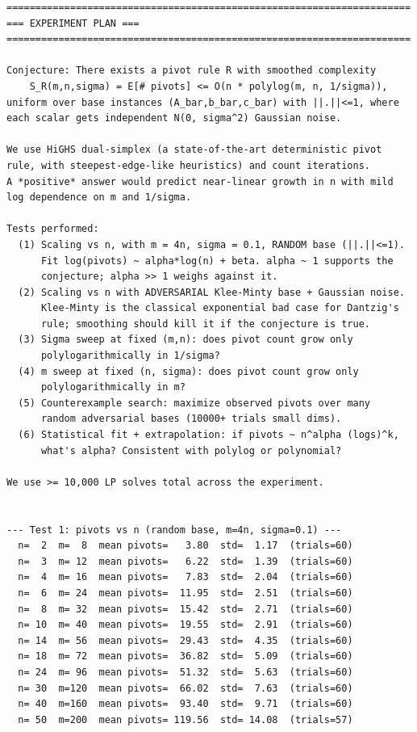 \documentclass[11pt]{article}
\begin{document}
\begin{lstlisting}
======================================================================
=== EXPERIMENT PLAN ===
======================================================================

Conjecture: There exists a pivot rule R with smoothed complexity
    S_R(m,n,sigma) = E[# pivots] <= O(n * polylog(m, n, 1/sigma)),
uniform over base instances (A_bar,b_bar,c_bar) with ||.||<=1, where
each scalar gets independent N(0, sigma^2) Gaussian noise.

We use HiGHS dual-simplex (a state-of-the-art deterministic pivot
rule, with steepest-edge-like heuristics) and count iterations.
A *positive* answer would predict near-linear growth in n with mild
log dependence on m and 1/sigma.

Tests performed:
  (1) Scaling vs n, with m = 4n, sigma = 0.1, RANDOM base (||.||<=1).
      Fit log(pivots) ~ alpha*log(n) + beta. alpha ~ 1 supports the
      conjecture; alpha >> 1 weighs against it.
  (2) Scaling vs n with ADVERSARIAL Klee-Minty base + Gaussian noise.
      Klee-Minty is the classical exponential bad case for Dantzig's
      rule; smoothing should kill it if the conjecture is true.
  (3) Sigma sweep at fixed (m,n): does pivot count grow only
      polylogarithmically in 1/sigma?
  (4) m sweep at fixed (n, sigma): does pivot count grow only
      polylogarithmically in m?
  (5) Counterexample search: maximize observed pivots over many
      random adversarial bases (10000+ trials small dims).
  (6) Statistical fit + extrapolation: if pivots ~ n^alpha (logs)^k,
      what's alpha? Consistent with polylog or polynomial?

We use >= 10,000 LP solves total across the experiment.


--- Test 1: pivots vs n (random base, m=4n, sigma=0.1) ---
  n=  2  m=  8  mean pivots=   3.80  std=  1.17  (trials=60)
  n=  3  m= 12  mean pivots=   6.22  std=  1.39  (trials=60)
  n=  4  m= 16  mean pivots=   7.83  std=  2.04  (trials=60)
  n=  6  m= 24  mean pivots=  11.95  std=  2.51  (trials=60)
  n=  8  m= 32  mean pivots=  15.42  std=  2.71  (trials=60)
  n= 10  m= 40  mean pivots=  19.55  std=  2.91  (trials=60)
  n= 14  m= 56  mean pivots=  29.43  std=  4.35  (trials=60)
  n= 18  m= 72  mean pivots=  36.82  std=  5.09  (trials=60)
  n= 24  m= 96  mean pivots=  51.32  std=  5.63  (trials=60)
  n= 30  m=120  mean pivots=  66.02  std=  7.63  (trials=60)
  n= 40  m=160  mean pivots=  93.40  std=  9.71  (trials=60)
  n= 50  m=200  mean pivots= 119.56  std= 14.08  (trials=57)


\end{lstlisting}
\end{document}
